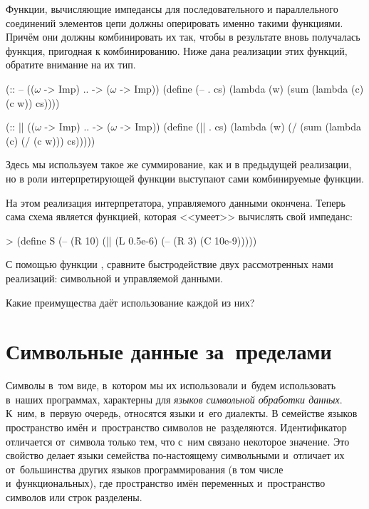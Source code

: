 Функции, вычисляющие импедансы для последовательного и параллельного соединений элементов цепи должны оперировать именно такими функциями. Причём они должны комбинировать их так, чтобы в результате вновь получалась функция, пригодная к комбинированию. Ниже дана реализации этих функций, обратите внимание на их тип.
\begin{Definition}[emph={cs,c,w}]
(:: -- (($\omega$ -> Imp) .. -> ($\omega$ -> Imp))
  (define (-- . cs) 
    (lambda (w) (sum (lambda (c) (c w)) cs))))

(:: || (($\omega$ -> Imp) .. -> ($\omega$ -> Imp))
  (define (|| . cs) 
    (lambda (w) (/ (sum (lambda (c) (/ (c w))) cs)))))
\end{Definition}
Здесь мы используем такое же суммирование, как и в предыдущей реализации, но в роли интерпретирующей функции  выступают сами комбинируемые функции.

На этом реализация интерпретатора, управляемого данными окончена. Теперь сама схема является функцией, которая <<умеет>> вычислять свой импеданс:

\begin{SchemeCode}
> (define S
    (-- (R 10)
        (|| (L 0.5e-6)
            (-- (R 3)
                (C 10e-9)))))
\end{SchemeCode}

\begin{Assignment}
 С помощью функции , сравните быстродействие двух рассмотренных нами реализаций: символьной и управляемой данными.

 Какие преимущества даёт использование каждой из них?
\end{Assignment}

\section{Символьные данные \mbox{за~пределами~\Scheme}}%
Символы в~том виде, в~котором мы их использовали и~будем использовать в~наших программах, характерны для \emph{языков символьной обработки данных}. К~ним, в~первую очередь, относятся языки  \Lisp и~его диалекты.
В семействе языков \Lisp пространство имён и~пространство символов не~разделяются. Идентификатор отличается от~символа только тем, что с~ним связано некоторое значение. Это свойство делает языки семейства \Lisp по-настоящему символьными и~отличает их от~большинства других языков программирования (в том числе и~функциональных), где пространство имён переменных и~пространство символов или строк разделены.

